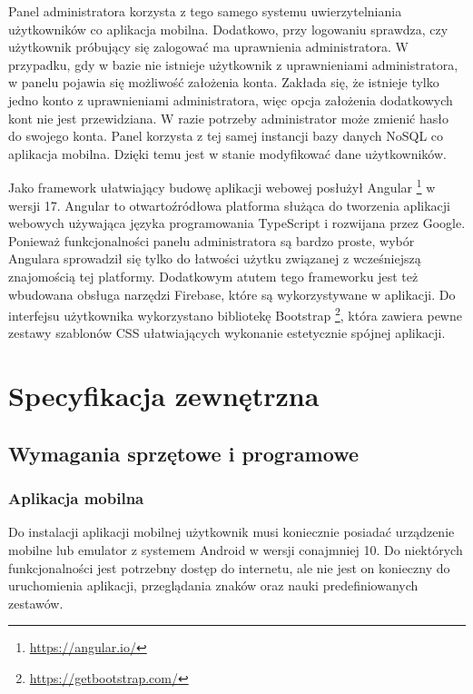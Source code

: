 \documentclass[a4paper,twoside,12pt]{book}
\begin{document}
Panel administratora korzysta z tego samego systemu uwierzytelniania użytkowników co aplikacja mobilna. Dodatkowo, przy logowaniu sprawdza, czy użytkownik próbujący się zalogować ma uprawnienia administratora. W przypadku, gdy w bazie nie istnieje użytkownik z uprawnieniami administratora, w panelu pojawia się możliwość założenia konta. Zakłada się, że istnieje tylko jedno konto z uprawnieniami administratora, więc opcja założenia dodatkowych kont nie jest przewidziana. W razie potrzeby administrator może zmienić hasło do swojego konta. Panel korzysta z tej samej instancji bazy danych NoSQL co aplikacja mobilna. Dzięki temu jest w stanie modyfikować dane użytkowników. 

Jako framework ułatwiający budowę aplikacji webowej posłużył Angular \footnote{\url{https://angular.io/}} w wersji 17. Angular to otwartoźródłowa platforma służąca do tworzenia aplikacji webowych używająca języka programowania TypeScript i rozwijana przez Google. Ponieważ funkcjonalności panelu administratora są bardzo proste, wybór Angulara sprowadził się tylko do łatwości użytku związanej z wcześniejszą znajomością tej platformy. Dodatkowym atutem tego frameworku jest też wbudowana obsługa narzędzi Firebase, które są wykorzystywane w aplikacji. Do interfejsu użytkownika wykorzystano bibliotekę Bootstrap \footnote{\url{https://getbootstrap.com/}}, która zawiera pewne zestawy szablonów CSS ułatwiających wykonanie estetycznie spójnej aplikacji.

\chapter{Specyfikacja zewnętrzna}
\label{ch:04}

\section{Wymagania sprzętowe i programowe}

\subsection{Aplikacja mobilna}

Do instalacji aplikacji mobilnej użytkownik musi koniecznie posiadać urządzenie mobilne lub emulator z systemem Android w wersji conajmniej 10. Do niektórych funkcjonalności jest potrzebny dostęp do internetu, ale nie jest on konieczny do uruchomienia aplikacji, przeglądania znaków oraz nauki predefiniowanych zestawów. 
\end{document}
